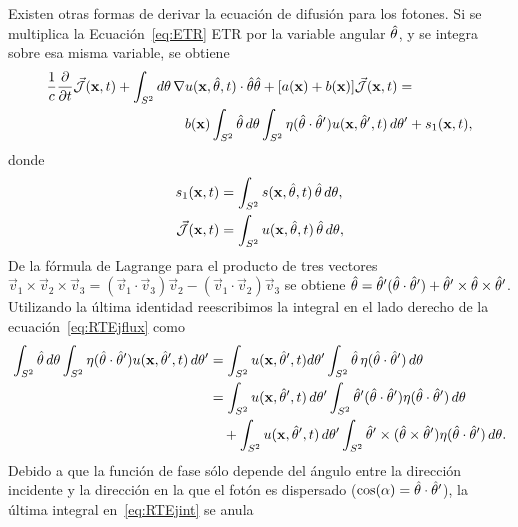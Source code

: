 Existen otras formas de derivar la ecuación de difusión para los fotones. 
Si se multiplica la Ecuación~\eqref{eq:ETR} ETR por la variable angular $\hat{\theta}$, y se integra 
sobre esa misma variable, se obtiene
\begin{equation}
\begin{split}
\begin{aligned}
\frac{1}{c}\frac{\partial}{\partial t} \vec{ \mathcal{J}}(\mathbf{x},t)+\int_{S^2} d\theta \, \nabla & u(\mathbf{x},\hat{\theta},t) \cdot \hat{\theta} \hat{\theta} 
+[a(\mathbf{x})+b(\mathbf{x})]\vec{ \mathcal{J}}(\mathbf{x},t)=\\
&b(\mathbf{x})\int_{S^2} \hat{\theta} \,  d\theta \int_{S^2} \eta(\hat{\theta} \cdot \hat{\theta}')  u(\mathbf{x},\hat{\theta}',t) \, d\theta' + s_1(\mathbf{x},t),
\end{aligned}
\end{split}
\label{eq:RTEjflux}
\end{equation}
donde
\begin{equation}
\begin{split}
\begin{aligned}
s_1(\mathbf{x},t)&=\int_{S^2} s(\mathbf{x},\hat{\theta},t)  \, \hat{\theta} \,  d\theta,\\
 \vec{ \mathcal{J}}(\mathbf{x},t)&=\int_{S^2} u(\mathbf{x},\hat{\theta},t) \, \hat{\theta} \, d\theta,
\label{eq:RTEsflux1}
\end{aligned}
\end{split}
\end{equation}
De la fórmula de Lagrange para el producto de tres vectores $\vec{v}_1 \times \vec{v}_2 \times \vec{v}_3=(\vec{v}_1\cdot \vec{v}_3) \vec{v}_2-(\vec{v}_1 \cdot \vec{v}_2) \vec{v}_3$ 
se obtiene  $\hat{\theta}= \hat{\theta}'(\hat{\theta}\cdot \hat{\theta}') + \hat{\theta}' \times\hat{\theta} \times \hat{\theta}'$.
Utilizando la última identidad reescribimos la integral en el lado derecho de la ecuación~\eqref{eq:RTEjflux} como
\begin{equation}
\begin{split}
\begin{aligned}
\int_{S^2} \hat{\theta} \, d\theta \int_{S^2} \eta(\hat{\theta} \cdot \hat{\theta}')  u(\mathbf{x},\hat{\theta}',t) \, d\theta' 
&=\int_{S^2} u(\mathbf{x},\hat{\theta}',t) d\theta'  \int_{S^2} \hat{\theta}  \, \eta(\hat{\theta} \cdot \hat{\theta}') \, d\theta\\
&=\int_{S^2} u(\mathbf{x},\hat{\theta}',t) \, d\theta' \int_{S^2} \hat{\theta}' (\hat{\theta} \cdot \hat{\theta}') \eta(\hat{\theta} \cdot \hat{\theta}') \, d\theta \\
&\quad+ \int_{S^2} u(\mathbf{x},\hat{\theta}',t) \, d\theta' \int_{S^2}  \hat{\theta}' \times(\hat{\theta} \times \hat{\theta}') \eta(\hat{\theta} \cdot \hat{\theta}') \, d\theta .
\end{aligned}
\end{split}
\label{eq:RTEjint}
\end{equation}
Debido a que la función de fase sólo depende del ángulo entre 
la dirección incidente y la dirección en la que el fotón es dispersado ($\cos(\alpha)=\hat{\theta} \cdot \hat{\theta}'$), la última integral en~\eqref{eq:RTEjint} se anula
